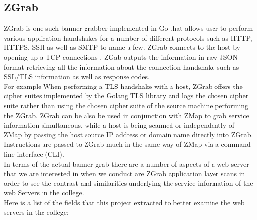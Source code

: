 \documentclass[a4wide,leqno,12pt]{report}
\begin{document}
\subsection{ZGrab}
ZGrab is one such banner grabber implemented in Go \cite{pike2009go} that allows user to perform various application handshakes for a number of different protocols such as HTTP, HTTPS, SSH \cite{ylonen2006secure} as well as SMTP\cite{2012smtp} to name a few. ZGrab connects to the host by opening up a TCP connections \cite{durumeric2015search}. ZGab outputs the information in raw JSON format retrieving all the information about the connection handshake such as SSL/TLS information as well as response codes.\\

For example When performing a TLS handshake with a host, ZGrab offers the cipher suites implemented by the Golang TLS library and logs the chosen cipher suite\cite{durumeric2015search} rather than using the chosen cipher suite of the source machine performing the ZGrab. ZGrab can be also be used in conjunction with ZMap to grab service information simultaneous, while a host is being scanned or independently of ZMap by passing the host source IP address or domain name directly into ZGrab. Instructions are passed to ZGrab much in the same way of ZMap via a command line interface (CLI).\\

In terms of the actual banner grab there are a number of aspects of a web server that we are interested in when we conduct are ZGrab application layer scans in order to see the contrast and similarities underlying the service information of the web Servers in the college.\\
Here is a list of the fields that this project extracted to better examine the web servers in the college:
\end{document}

